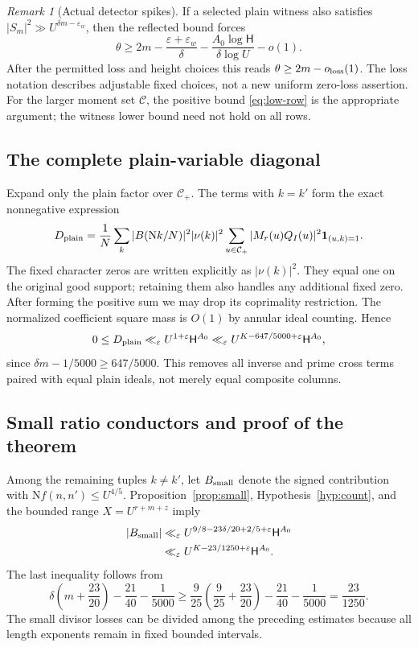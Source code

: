 \documentclass[11pt]{article}
\theoremstyle{definition}
\theoremstyle{remark}
\newtheorem{remark}[theorem]{Remark}
\numberwithin{equation}{section}
\newcommand{\Nm}{\mathrm N}
\newcommand{\CC}{\mathcal C}
\newcommand{\HH}{\mathsf H}
\newcommand{\ind}{\mathbf1}
\newcommand{\ee}{\varepsilon}
\begin{document}
\begin{remark}[Actual detector spikes]
If a selected plain witness also satisfies
$|S_m|^2\gg U^{\delta m-\ee_w}$, then the reflected bound forces
\[
\theta\ge2m-\frac{\ee+\ee_w}{\delta}
-\frac{A_0\log\HH}{\delta\log U}-o(1).
\]
After the permitted loss and height choices this reads
$\theta\ge2m-o_{\rm loss}(1)$. The loss notation describes adjustable
fixed choices, not a new uniform zero-loss assertion. For the larger
moment set $\CC$, the positive bound \eqref{eq:low-row} is the
appropriate argument; the witness lower bound need not hold on all rows.
\end{remark}

\subsection{The complete plain-variable diagonal}

Expand only the plain factor over $\CC_+$. The terms with $k=k'$
form the exact nonnegative expression
\begin{equation}\label{eq:plain-diagonal}
D_{\rm plain}=
\frac1N\sum_k |B(\Nm k/N)|^2|\nu(k)|^2
\sum_{u\in\CC_+}|M_r(u)Q_I(u)|^2\ind_{(u,k)=1}.
\end{equation}
The fixed character zeros are written explicitly as $|\nu(k)|^2$.
They equal one on the original good support; retaining them also
handles any additional fixed zero. After forming the positive sum
we may drop its coprimality restriction. The normalized coefficient
square mass is $O(1)$ by annular ideal counting. Hence
\begin{equation}\label{eq:diag-bound}
0\le D_{\rm plain}\ll_\ee U^{1+\ee}\HH^{A_0}
\ll_\ee U^{K-647/5000+\ee}\HH^{A_0},
\end{equation}
since $\delta m-1/5000\ge647/5000$.
This removes all inverse and prime cross terms paired with equal
plain ideals, not merely equal composite columns.

\subsection{Small ratio conductors and proof of the theorem}

Among the remaining tuples $k\ne k'$, let $B_{\rm small}$ denote
the signed contribution with $\Nm f(n,n')\le U^{4/5}$.
Proposition~\ref{prop:small}, Hypothesis~\ref{hyp:count}, and the bounded
range $X=U^{r+m+z}$ imply
\begin{align}
|B_{\rm small}|
&\ll_\ee U^{9/8-23\delta/20+2/5+\ee}\HH^{A_0}\nonumber\\
&\ll_\ee U^{K-23/1250+\ee}\HH^{A_0}.
\label{eq:small-margin}
\end{align}
The last inequality follows from
\begin{equation}\label{eq:margin-arithmetic}
\delta\left(m+\frac{23}{20}\right)-\frac{21}{40}-\frac1{5000}
\ge\frac9{25}\left(\frac9{25}+\frac{23}{20}\right)
-\frac{21}{40}-\frac1{5000}=\frac{23}{1250}.
\end{equation}
The small divisor losses can be divided among the preceding estimates
because all length exponents remain in fixed bounded intervals.
\end{document}
